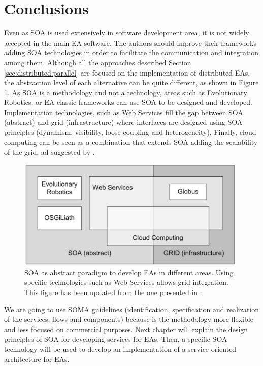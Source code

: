 \section{Conclusions}

Even as SOA is used extensively in software development area, it is
not widely accepted in the main EA software. %
The authors should improve their frameworks adding SOA technologies in
order to facilitate the communication and integration among them. %
 Although all the approaches described Section \ref{sec:distributed:parallel} are focused
 on the implementation of distributed EAs, the abstraction level of
 each alternative can be quite different, as shown in Figure
 \ref{fig:soagrid}.  As SOA is a methodology and not a technology,
 areas such as Evolutionary Robotics, or EA classic frameworks can use
 SOA to be designed and developed. Implementation technologies, such
 as Web Services fill the gap between SOA (abstract) and grid
 (infrastructure) where interfaces are designed using SOA principles
 (dynamism, visibility, loose-coupling and heterogeneity). Finally,
 cloud computing can be seen as a combination that extends SOA adding
 the scalability of the grid, ad suggested by 
 \cite{SOALIB}. %


\begin{figure}
\centering
\includegraphics[width=26pc]{gfx/soa/soagrid.png}
\caption{SOA as abstract paradigm to develop EAs in different
  areas. %
 Using specific technologies such as Web Services allows grid integration. This figure has been updated from the one presented in \cite{SOALIB}.}
\label{fig:soagrid}
\end{figure}
We are going to use SOMA guidelines (identification, specification and
realization of the services, flows and components) because is the
methodology more flexible and less focused on commercial
purposes. Next chapter will explain the design principles of SOA for
developing services for EAs. Then, a specific SOA technology will be
used to develop an implementation of a service oriented architecture
for EAs.
